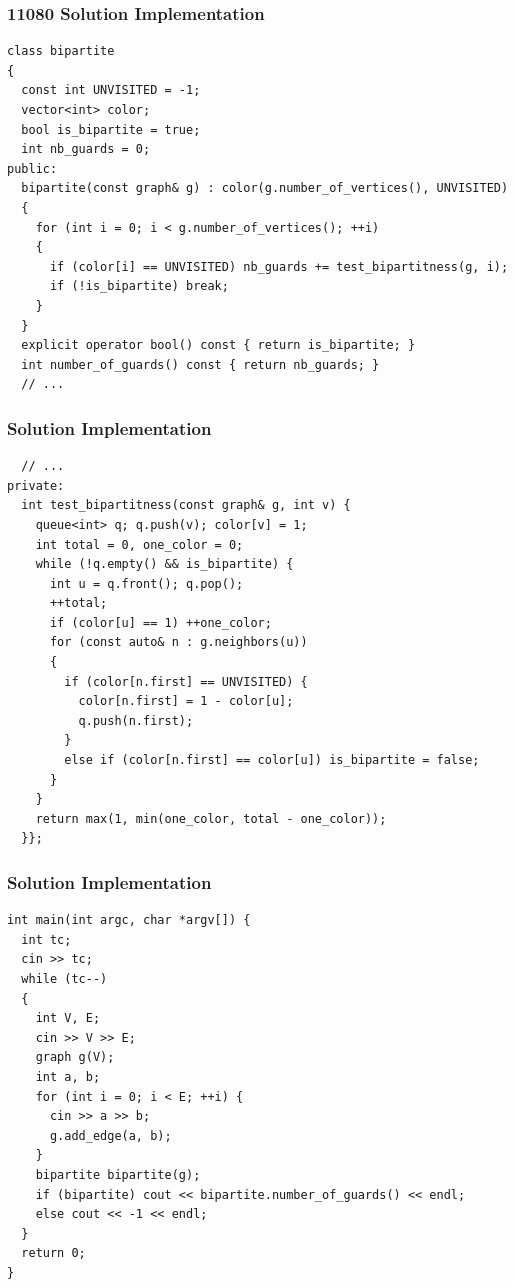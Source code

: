 \documentclass{beamer}
\begin{document}
\begin{frame}[containsverbatim]
\frametitle{11080 Solution Implementation}
\scriptsize
\begin{lstlisting}
class bipartite
{
  const int UNVISITED = -1;
  vector<int> color;
  bool is_bipartite = true;
  int nb_guards = 0;
public:
  bipartite(const graph& g) : color(g.number_of_vertices(), UNVISITED)
  {
    for (int i = 0; i < g.number_of_vertices(); ++i)
    {
      if (color[i] == UNVISITED) nb_guards += test_bipartitness(g, i);
      if (!is_bipartite) break;
    }
  }
  explicit operator bool() const { return is_bipartite; }
  int number_of_guards() const { return nb_guards; }
  // ...
\end{lstlisting}

\end{frame}

\begin{frame}[containsverbatim]
\frametitle{Solution Implementation}
\scriptsize
\begin{lstlisting}
  // ...
private:
  int test_bipartitness(const graph& g, int v) {
    queue<int> q; q.push(v); color[v] = 1;
    int total = 0, one_color = 0;
    while (!q.empty() && is_bipartite) {
      int u = q.front(); q.pop();
      ++total;
      if (color[u] == 1) ++one_color;
      for (const auto& n : g.neighbors(u))
      {
        if (color[n.first] == UNVISITED) {
          color[n.first] = 1 - color[u];
          q.push(n.first);
        }
        else if (color[n.first] == color[u]) is_bipartite = false;
      }
    }
    return max(1, min(one_color, total - one_color));
  }};
\end{lstlisting}

\end{frame}

\begin{frame}[containsverbatim]
\frametitle{Solution Implementation}
\scriptsize
\begin{lstlisting}
int main(int argc, char *argv[]) {
  int tc;
  cin >> tc;
  while (tc--)
  {
    int V, E;
    cin >> V >> E;
    graph g(V);
    int a, b;
    for (int i = 0; i < E; ++i) {
      cin >> a >> b;
      g.add_edge(a, b);
    }
    bipartite bipartite(g);
    if (bipartite) cout << bipartite.number_of_guards() << endl;
    else cout << -1 << endl;
  }
  return 0;
}
\end{lstlisting}

\end{frame}

\fi
\end{document}
